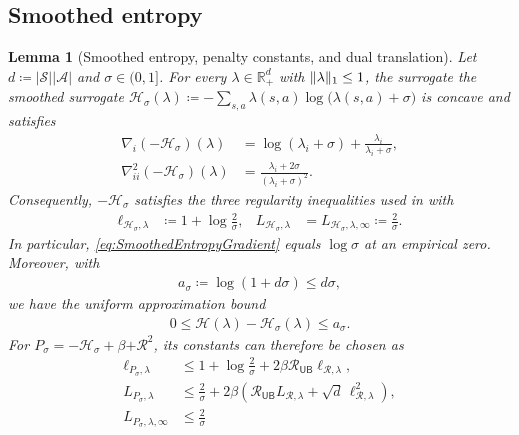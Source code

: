 \documentclass{article}
\theoremstyle{plain}
\newtheorem{lemma}[theorem]{Lemma}
\theoremstyle{definition}
\theoremstyle{remark}
\def\RR{{\mathbb{R}}}
\def\SS{{\mathcal{S}}}
\def\AA{{\mathcal{A}}}
\newcommand{\card}[1]{\left|#1\right|}
\DeclarePairedDelimiter{\norm}{\lVert}{\rVert}
\DeclarePairedDelimiter{\plus}{[}{]_{+}}
\newcommand{\pen}[1]{{\plus{#1}^2}}
\newcommand{\define}{\coloneqq}
\def\ss{{s}}
\def\HH{{\mathcal{H}}}
\def\RegMax{{\mathcal{R}_{\mathsf{UB}}}}
\def\aa{{a}}
\def\ss{{s}}
\def\Reg{{\mathcal{R}}}
\begin{document}
\subsection{Smoothed entropy}
\label{sec:AppendixSmoothedEntropy}

\begin{lemma}[Smoothed entropy, penalty constants, and dual translation]
 \label{lem:SmoothedEntropyProperties}
 Let $d\define\card{\SS}\card{\AA}$ and $\sigma\in(0,1]$.
 For every $\lambda\in\RR_+^d$ with $\norm{\lambda}_1\leq1$, the surrogate
 the smoothed surrogate $\HH_\sigma(\lambda)
  \define-\sum_{\ss,\aa}\lambda(\ss,\aa)
  \log\bigl(\lambda(\ss,\aa)+\sigma\bigr)$
 is concave and satisfies
 \begin{align}
  \nabla_i(-\HH_\sigma)(\lambda)
   & =\log(\lambda_i+\sigma)
  +\frac{\lambda_i}{\lambda_i+\sigma},
  \label{eq:SmoothedEntropyGradient}                  \\
  \nabla_{ii}^2(-\HH_\sigma)(\lambda)
   & =\frac{\lambda_i+2\sigma}{(\lambda_i+\sigma)^2}.
  \label{eq:SmoothedEntropyHessian}
 \end{align}
 Consequently, $-\HH_\sigma$ satisfies the three regularity
 inequalities used in  with
 \begin{align}
  \ell_{\HH_\sigma,\lambda}
   & \define 1+\log\frac{2}{\sigma},
   & L_{\HH_\sigma,\lambda}
   & =L_{\HH_\sigma,\lambda,\infty}\define\frac{2}{\sigma}.
  \label{eq:SmoothedEntropyConstants}
 \end{align}
 In particular, \eqref{eq:SmoothedEntropyGradient} equals
 $\log\sigma$ at an empirical zero. Moreover, with
 \begin{align}
  a_\sigma\define\log(1+d\sigma)\leq d\sigma,
 \end{align}
 we have the uniform approximation bound
 \begin{align*}
  0\leq\HH(\lambda)-\HH_\sigma(\lambda)\leq a_\sigma.
 \end{align*}
 For $P_\sigma=-\HH_\sigma+\beta\pen{\Reg}$, its constants can
 therefore be chosen as
 \begin{align}
  \ell_{P_\sigma,\lambda}
   & \leq1+\log\frac{2}{\sigma}
  +2\beta\RegMax\ell_{\Reg,\lambda},
  \label{eq:SmoothedPenaltyGradientConstant} \\
  L_{P_\sigma,\lambda}
   & \leq\frac{2}{\sigma}
  +2\beta\left(\RegMax L_{\Reg,\lambda}
  +\sqrt d\,\ell_{\Reg,\lambda}^2\right),
  \label{eq:SmoothedPenaltyL2Constant}       \\
  L_{P_\sigma,\lambda,\infty}
   & \leq\frac{2}{\sigma}

\end{align}
\end{lemma}
\end{document}
